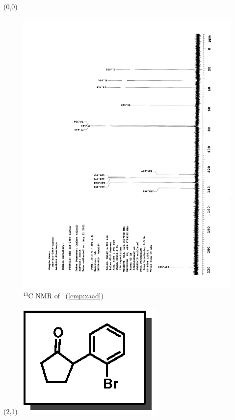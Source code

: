 \clearpage
\begin{textblock}{20}(0,0)
\begin{figure}[htb]
\caption{$^{13}$C NMR of  \CMPxaad\ (\ref{cmp:xaad})}
\includegraphics[scale=0.75, trim = 0mm 0mm 0mm 5mm,
clip]{chp_asymmetric/images/nmr/xaadC}
\vspace{-100pt}
\end{figure}
\end{textblock}
\begin{textblock}{1}(2,1)
\includegraphics[scale=0.8, angle=90]{chp_asymmetric/images/xaad}
\end{textblock}
\clearpage

